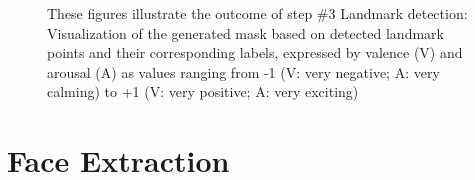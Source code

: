 \begin{figure}[htbp]
  \hfill
  \caption[ER pipeline step \#3: Mask]{These figures illustrate the outcome of step \#3 Landmark detection: Visualization of the generated mask based on detected landmark points and their corresponding labels, expressed by valence (V) and arousal (A) as values ranging from -1 (V: very negative; A: very calming) to +1 (V: very positive; A: very exciting)}
  \label{fig:MethodologyMask}
\end{figure}


\section{Face Extraction}

